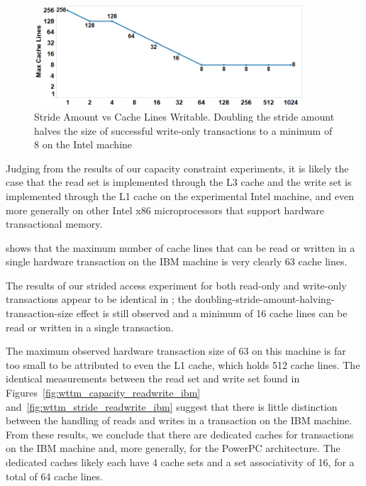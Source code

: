 \begin{figure}[]%
\centering
\includegraphics[width=100mm]{images/wttm_stride_write_intel}
\caption{Stride Amount vs Cache Lines Writable. 
Doubling the stride amount halves the size of successful write-only
transactions to a minimum of 8 on the Intel machine}
\label{fig:wttm_stride_write_intel}
\end{figure}

Judging from the results of our capacity constraint experiments, it is likely
the case that the read set is implemented through the {L3} cache and the
write set is implemented through the {L1} cache on the experimental Intel
machine, and even more generally on other Intel x86 microprocessors that support
hardware transactional memory.


 shows that the maximum number of
cache lines that can be read or written in a single hardware transaction on the
IBM machine is very clearly 63 cache lines.

The results of our strided access experiment for both read-only and write-only
transactions appear to be identical in
; the
doubling-stride-amount-halving-transaction-size effect is still observed and a
minimum of 16 cache lines can be read or written in a single transaction.

The maximum observed hardware transaction size of 63 on this machine is far too
small to be attributed to even the {L1} cache, which holds 512 cache
lines. The identical measurements between the read set and write set found in
Figures~\ref{fig:wttm_capacity_readwrite_ibm}
and~\ref{fig:wttm_stride_readwrite_ibm} suggest that there is little distinction
between the handling of reads and writes in a transaction on the IBM machine.
From these results, we conclude that there are dedicated caches for transactions
on the IBM machine and, more generally, for the PowerPC architecture. The
dedicated caches likely each have 4 cache sets and a set associativity of 16,
for a total of 64 cache lines.

